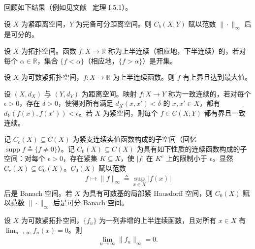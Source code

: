 \documentclass[../main.tex]{subfiles}
\begin{document}
回顾如下结果（例如见文献~\cite{ref107} 定理 I.5.1）。

\begin{proposition}\label{proposition:appA-Cb可分}\label{proposition:chA-C0可分}
\label{subsection:appA-可分}
\label{paragraph:appA-可分}
设 $X$ 为紧距离空间，$Y$ 为完备可分距离空间。则 $C_b(X;Y)$ 赋以范数 $\|\cdot\|_\infty$ 后是可分的。
\end{proposition}

\begin{definition}[上、下半连续]\label{definition:appA-半连续}
设 $X$ 为拓扑空间。函数 $f:X\to\mathbb{R}$ 称为上半连续（相应地，下半连续）的，若对每个 $\alpha\in\mathbb{R}$，集合 $\{f<\alpha\}$（相应地，$\{f>\alpha\}$）是开集。
\end{definition}

\begin{proposition}\label{proposition:appA-上半连续最大值}
设 $X$ 为可数紧拓扑空间，$f:X\to\mathbb{R}$ 为上半连续函数。则 $f$ 有上界且达到最大值。
\end{proposition}

\begin{definition}[一致连续]\label{definition:appA-一致连续}
设 $(X,d_X)$ 与 $(Y,d_Y)$ 为距离空间。映射 $f:X\to Y$ 称为一致连续的，若对每个 $\epsilon>0$，存在 $\delta>0$，使得对所有满足 $d_X(x,x')<\delta$ 的 $x,x'\in X$，都有 $d_Y(f(x),f(x'))<\epsilon$。若 $X$ 为紧空间，则每个 $f\in C(X;Y)$ 都有界且一致连续。
\end{definition}

\begin{definition}[紧支连续函数与 $C_0$]\label{definition:appA-Cc与C0}
记 $C_c(X)\subseteq C(X)$ 为紧支连续实值函数构成的子空间（回忆 $\operatorname{supp}f\triangleq \{f\neq 0\}$）。记 $C_0(X)\subseteq C(X)$ 为具有如下性质的连续函数构成的子空间：对每个 $\epsilon>0$，存在紧集 $K\subseteq X$，使 $|f|$ 在 $K^c$ 上的限制小于 $\epsilon$。显然 $C_c(X)\subseteq C_0(X)$。$C_0(X)$ 赋以范数
\begin{align*}
f\mapsto\|f\|_\infty\triangleq \sup_{x\in X}|f(x)|
\end{align*}
后是 Banach 空间。若 $X$ 为具有可数基的局部紧 Hausdorff 空间，则 $C_0(X)$ 赋以范数 $\|\cdot\|_\infty$ 后是可分 Banach 空间。
\end{definition}

\begin{proposition}[Dini 定理]\label{proposition:appA-Dini}
设 $X$ 为可数紧拓扑空间，$\{f_n\}$ 为一列非增的上半连续函数，且对所有 $x\in X$ 有 $\lim_{n\to\infty}f_n(x)=0$。则
\begin{align*}
\lim_{n\to\infty}\|f_n\|_\infty=0.
\end{align*}
\end{proposition}
\end{document}
